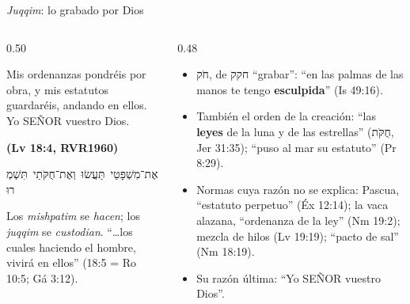 \documentclass[hyperref={bookmarks=false},aspectratio=169]{beamer}
\newcommand{\heb}[1]{\mbox{\foreignlanguage{hebrew}{#1}}}
\newcommand{\SENOR}{S{\fontsize{0.78em}{1em}\selectfont EÑOR}}
\newcommand{\fuente}[1]{\par\hfill{\upshape\bfseries\footnotesize\textcolor{azul}{#1}}}
\newcommand{\destacar}[1]{\textbf{\textcolor{azul}{#1}}}
\begin{document}
\begin{frame}{\emph{Juqqim}: lo grabado por Dios}
\begin{columns}[c,onlytextwidth]
\begin{column}{0.50\textwidth}
\begin{cita}Mis ordenanzas pondréis por obra, y mis estatutos guardaréis, andando en ellos. Yo \SENOR{} vuestro Dios.\fuente{(Lv 18:4, RVR1960)}\end{cita}
\begin{center}\small\heb{אֶת־מִשְׁפָּטַי תַּעֲשׂוּ וְאֶת־חֻקֹּתַי תִּשְׁמְרוּ}\end{center}
\scriptsize Los \emph{mishpatim} se \emph{hacen}; los \emph{juqqim} se \emph{custodian}. ``\ldots{}los cuales haciendo el hombre, vivirá en ellos'' (18:5 = Ro 10:5; Gá 3:12).
\end{column}
\begin{column}{0.48\textwidth}\scriptsize
\begin{itemize}
\item \heb{חֹק}, de \heb{חקק} ``grabar'': ``en las palmas de las manos te tengo \destacar{esculpida}'' (Is 49:16).
\item También el orden de la creación: ``las \destacar{leyes} de la luna y de las estrellas'' (\heb{חֻקֹּת}, Jer 31:35); ``puso al mar su estatuto'' (Pr 8:29).
\item Normas cuya razón no se explica: Pascua, ``estatuto perpetuo'' (Éx 12:14); la vaca alazana, ``ordenanza de la ley'' (Nm 19:2); mezcla de hilos (Lv 19:19); ``pacto de sal'' (Nm 18:19).
\item Su razón última: ``Yo \SENOR{} vuestro Dios''.
\end{itemize}
\end{column}
\end{columns}
\end{frame}
\end{document}
